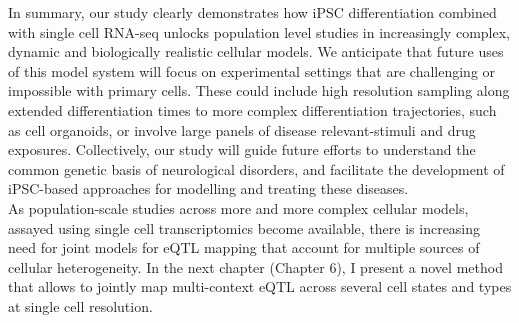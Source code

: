 In summary, our study clearly demonstrates how iPSC differentiation combined with single cell RNA-seq unlocks population level studies in increasingly complex, dynamic and biologically realistic cellular models. 
We anticipate that future uses of this model system will focus on experimental settings that are challenging or impossible with primary cells. 
These could include high resolution sampling along extended differentiation times to more complex differentiation trajectories, such as cell organoids, or involve large panels of disease relevant-stimuli and drug exposures. 
Collectively, our study will guide future efforts to understand the common genetic basis of neurological disorders, and facilitate the development of iPSC-based approaches for modelling and treating these diseases. \\

As population-scale studies across more and more complex cellular models, assayed using single cell transcriptomics become available, there is increasing need for joint models for eQTL mapping that account for multiple sources of cellular heterogeneity. 
In the next chapter (Chapter 
6), I present a  novel method that allows to jointly map multi-context eQTL across several cell states and types at single cell resolution.

